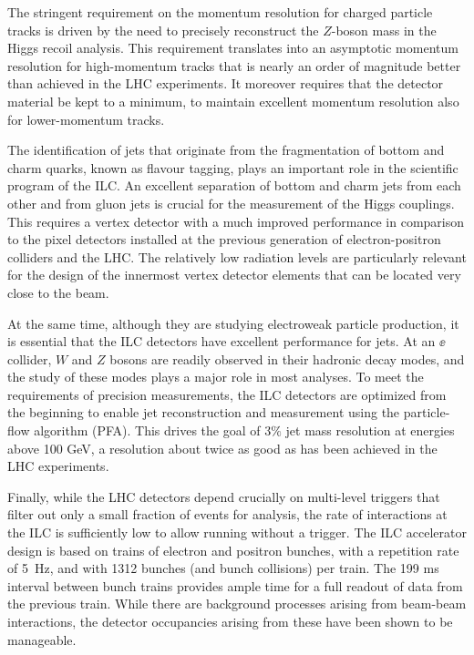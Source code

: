 The stringent requirement on the momentum resolution for charged particle tracks is driven by the need to  precisely reconstruct the $Z$-boson mass in the Higgs recoil analysis. This requirement translates into an asymptotic momentum resolution for high-momentum tracks that is nearly an order of magnitude better than achieved in the LHC experiments. It moreover requires that the detector material be kept to a minimum, to maintain excellent momentum resolution also for lower-momentum tracks.

The identification of jets that originate from the fragmentation of bottom and charm quarks, known as flavour tagging, plays an important role in the scientific program of the ILC. An excellent separation of bottom and charm jets from each other and from gluon jets is crucial for the measurement of the Higgs couplings. This requires a vertex detector with a much improved performance in comparison to the pixel detectors installed at the previous generation of electron-positron colliders and the LHC. The relatively low radiation levels are particularly relevant for the design of the innermost vertex detector elements that can be located very close to the beam.

At the same time, although they are studying electroweak particle
production, it is essential that the ILC detectors have excellent
performance for jets.   At an $\ee$ collider, $W$ and $Z$ bosons are
readily observed in their hadronic decay modes, and the study of these
modes plays a major role in most analyses.    To meet the requirements
of precision measurements, the ILC detectors are optimized from the
beginning to enable jet reconstruction and measurement using 
the particle-flow algorithm (PFA). This drives the goal of $3\%$
 jet mass resolution at energies above 100 GeV,  a resolution
about twice as good as has been achieved in  the LHC
 experiments.

Finally, while the LHC detectors depend crucially on multi-level
triggers that filter out only a small fraction of events for analysis,
the  rate of interactions at the ILC is sufficiently low to allow
running without a trigger.     The ILC accelerator design is based on
trains of electron and positron bunches, with a repetition rate of
5~Hz, and with 1312 bunches (and bunch
collisions) per train. 
The 199 ms interval between bunch trains provides ample time for a full
readout of data
 from the  previous train.  While there are background processes arising
 from  beam-beam interactions, the detector occupancies arising from these 
have been shown to be manageable.

